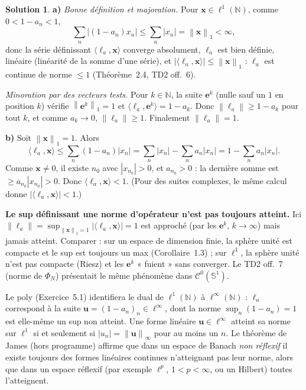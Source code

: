 \documentclass[11pt,a4paper]{article}
\newcommand{\N}{\mathbb{N}}
\newcommand{\Sun}{\mathbb{S}^1}
\newcommand{\norm}[1]{\left\|#1\right\|}
\newcommand{\Cz}{\mathcal{C}^0}
\theoremstyle{definition}
\newtheorem*{solution}{Solution}
\begin{document}
\begin{solution}
\noindent\textbf{a)} \emph{Bonne définition et majoration.} Pour $\mathbf x\in\ell^1(\N)$, comme $0<1-a_n<1$,
\[
\sum_n|(1-a_n)x_n|\le\sum_n|x_n|=\norm{\mathbf x}_1<\infty ,
\]
donc la série définissant $\langle\ell_a,\mathbf x\rangle$ converge absolument, $\ell_a$ est bien définie, linéaire (linéarité de la somme d'une série), et $|\langle\ell_a,\mathbf x\rangle|\le\norm{\mathbf x}_1$ : $\ell_a$ est continue de norme $\le1$ (Théorème~2.4, TD2 off.~6).

\emph{Minoration par des vecteurs tests.} Pour $k\in\N$, la suite $\mathbf e^k$ (nulle sauf un $1$ en position $k$) vérifie $\norm{\mathbf e^k}_1=1$ et $\langle\ell_a,\mathbf e^k\rangle=1-a_k$. Donc $\norm{\ell_a}\ge1-a_k$ pour tout $k$, et comme $a_k\to0$, $\norm{\ell_a}\ge1$. Finalement $\norm{\ell_a}=1$.

\medskip
\noindent\textbf{b)} Soit $\norm{\mathbf x}_1=1$. Alors
\[
\langle\ell_a,\mathbf x\rangle\le\sum_n(1-a_n)|x_n|=\sum_n|x_n|-\sum_na_n|x_n|=1-\sum_na_n|x_n| .
\]
Comme $\mathbf x\ne0$, il existe $n_0$ avec $|x_{n_0}|>0$, et $a_{n_0}>0$ : la dernière somme est $\ge a_{n_0}|x_{n_0}|>0$. Donc $\langle\ell_a,\mathbf x\rangle<1$. (Pour des suites complexes, le même calcul donne $|\langle\ell_a,\mathbf x\rangle|<1$.)
\end{solution}

\begin{pointcle}
\textbf{Le sup définissant une norme d'opérateur n'est pas toujours atteint.} Ici $\norm{\ell_a}=\sup_{\norm{\mathbf x}_1=1}|\langle\ell_a,\mathbf x\rangle|=1$ est approché (par les $\mathbf e^k$, $k\to\infty$) mais jamais atteint. Comparer : sur un espace de dimension finie, la sphère unité est compacte et le sup est toujours un max (Corollaire~1.3) ; sur $\ell^1$, la sphère unité n'est pas compacte (Riesz) et les $\mathbf e^k$ « fuient » sans converger. Le TD2 off.~7 (norme de $\Phi_N$) présentait le même phénomène dans $\Cz(\Sun)$.
\end{pointcle}

\begin{commentaire}
Le poly (Exercice~5.1) identifiera le dual de $\ell^1(\N)$ à $\ell^\infty(\N)$ : $\ell_a$ correspond à la suite $\mathbf u=(1-a_n)_n\in\ell^\infty$, dont la norme $\sup_n(1-a_n)=1$ est elle-même un sup non atteint. Une forme linéaire $\mathbf u\in\ell^\infty$ atteint sa norme sur $\ell^1$ si et seulement si $|u_n|=\norm{\mathbf u}_\infty$ pour au moins un $n$. Le théorème de James (hors programme) affirme que dans un espace de Banach \emph{non réflexif} il existe toujours des formes linéaires continues n'atteignant pas leur norme, alors que dans un espace réflexif (par exemple $\ell^p$, $1<p<\infty$, ou un Hilbert) toutes l'atteignent.
\end{commentaire}
\end{document}
